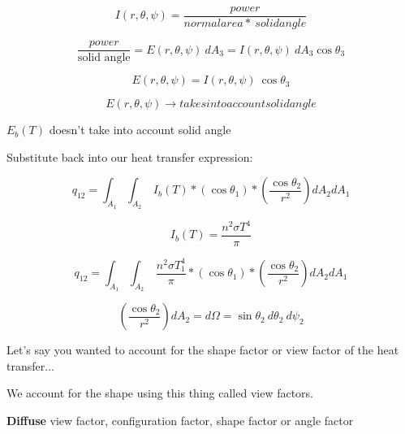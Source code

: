\documentclass[12pt]{article}
\renewcommand{\_}{\kern-1.5pt\textunderscore\kern-1.5pt}
\begin{document}
 \[ I \left( r, \theta , \psi  \right) =\frac{power}{normal area\ast~solid angle} \] \par

 \[ \frac{power}{\text{solid angle}}=E \left( r, \theta , \psi  \right) ~dA_{3}=I \left( r, \theta , \psi  \right) ~dA_{3}\cos  \theta _{3} \] \par

 \[ E \left( r, \theta , \psi  \right) =I \left( r, \theta , \psi  \right) ~\cos  \theta _{3} \] \par

 \[ E \left( r, \theta , \psi  \right)  \rightarrow takes into account solid angle \] \par

 \( E_{b} \left( T \right)  \)  doesn’t take into account solid angle\par

Substitute back into our heat transfer expression:\par

 \[ q_{12}= \int _{A_{1}}^{} \int _{A_{2}}^{}~I_{b} \left( T \right) \ast \left( \cos  \theta _{1} \right) \ast \left( \frac{\cos  \theta _{2}}{r^{2}} \right) dA_{2}dA_{1} \] \par

 \[ I_{b} \left( T \right) =\frac{n^{2} \sigma T^{4}}{ \pi } \] \par

 \[ q_{12}= \int _{A_{1}}^{} \int _{A_{2}}^{}~\frac{n^{2} \sigma T_{1}^{4}}{ \pi }\ast \left( \cos  \theta _{1} \right) \ast \left( \frac{\cos  \theta _{2}}{r^{2}} \right) dA_{2}dA_{1} \] \par

 \[  \left( \frac{\cos  \theta _{2}}{r^{2}} \right) dA_{2}=d \Omega =\sin  \theta _{2}~d \theta _{2}~d \psi _{2} \] \par

Let’s say you wanted to account for the shape factor or view factor of the heat transfer$ \ldots $ \par

\par

We account for the shape using this thing called view factors.\par

\par


\vspace{\baselineskip}
\textbf{Diffuse} view factor, configuration factor, shape factor or angle factor\par
\end{document}
